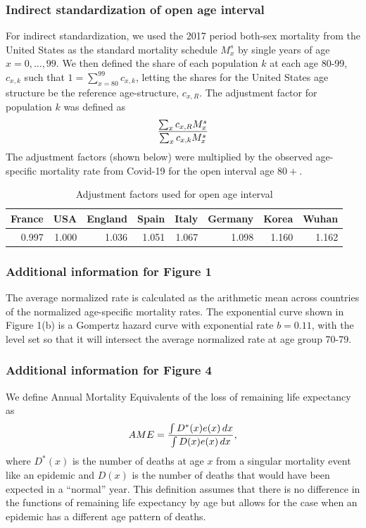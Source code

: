 \documentclass[9pt,twocolumn,twoside,lineno]{pnas-new}
\begin{document}
{\subsubsection*{Indirect standardization of open age interval}
\label{sec:indirect}
For indirect standardization, we used the 2017 period both-sex
mortality from the United States as the standard mortality schedule
$M^s_x$ by single years of age $x = 0, \ldots, 99$. We then defined
the share of each population $k$ at each age 80-99, $c_{x,k}$ such that $1
= \sum_{x = 80}^{99} c_{x,k}$, letting the shares for the United
States age structure be the reference age-structure, $c_{x,R}$. The adjustment factor for population $k$
was defined as 
$$
{\sum_x c_{x,R} M^s_x \over
  \sum_x c_{x,k} M^s_x}
$$
The adjustment factors (shown below) were multiplied by the observed  age-specific mortality
rate from Covid-19 for the open interval age $80+$.
\begin{table}[h]
  \centering
  \caption{Adjustment factors used for open age interval}
\begin{tabular}{rrrrrrrr}
France & USA  & England & Spain & Italy & Germany & Korea & Wuhan \\
  \midrule
  0.997 & 1.000 & 1.036 & 1.051 & 1.067 & 1.098 & 1.160 & 1.162 \\
\bottomrule
\end{tabular}
\end{table}

\subsubsection*{Additional information for Figure 1} The average normalized rate is calculated as the arithmetic mean
across countries of the normalized age-specific mortality rates.  The
exponential curve shown in Figure 1(b) is a Gompertz hazard curve with
exponential rate $b = 0.11$, with the level set so that it will intersect
the average normalized rate at age group 70-79.


\subsubsection*{Additional information for Figure 4}
\label{sec:methods_fig4}

We define Annual Mortality Equivalents of the loss of remaining life
expectancy as 
\begin{equation}
AME = {\int D^*(x) e(x) \,dx \over \int D(x) e(x) \,dx},
\end{equation}
where $D^*(x)$ is the number of deaths at age $x$ from a singular mortality event
like an epidemic and $D(x)$ is the number of deaths that would have
been expected in a ``normal'' year. This definition assumes that there
is no difference in the functions of remaining life expectancy by age
but allows for the case when an epidemic has a different age pattern
of deaths.

}
\end{document}

